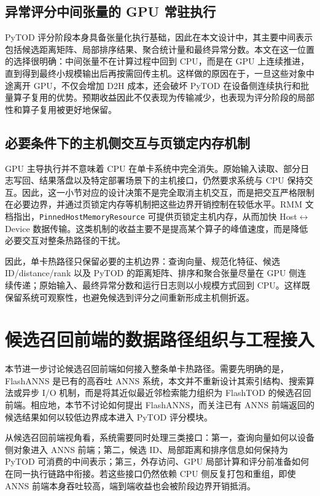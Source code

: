 \subsection{异常评分中间张量的 GPU 常驻执行}

PyTOD 评分阶段本身具备张量化执行基础，因此在本文设计中，其主要中间表示包括候选距离矩阵、局部排序结果、聚合统计量和最终异常分数。本文在这一位置的选择很明确：中间张量不在计算过程中回到 CPU，而是在 GPU 上连续推进，直到得到最终小规模输出后再按需回传主机。这样做的原因在于，一旦这些对象中途离开 GPU，不仅会增加 D2H 成本，还会破坏 PyTOD 在设备侧连续执行和批量算子复用的优势。预期收益因此不仅表现为传输减少，也表现为评分阶段的局部性和算子复用被更好地保留。

\subsection{必要条件下的主机侧交互与页锁定内存机制}

GPU 主导执行并不意味着 CPU 在单卡系统中完全消失。原始输入读取、部分日志写回、结果落盘以及特定部署场景下的主机接口，仍然要求系统与 CPU 保持交互。因此，这一小节对应的设计决策不是完全取消主机交互，而是把交互严格限制在必要边界，并通过页锁定内存等机制把这些边界开销控制在较低水平。RMM 文档指出，\texttt{PinnedHostMemoryResource} 可提供页锁定主机内存，从而加快 Host$\leftrightarrow$Device 数据传输\citep{rapids_rmm_pinned}。这类机制的收益主要不是提高某个算子的峰值速度，而是降低必要交互对整条热路径的干扰。

因此，单卡热路径只保留必要的主机边界：查询向量、规范化特征、候选 ID/distance/rank 以及 PyTOD 的距离矩阵、排序和聚合张量尽量在 GPU 侧连续传递；原始输入、最终异常分数和运行日志则以小规模方式回到 CPU。这样既保留系统可观察性，也避免候选到评分之间重新形成主机侧折返。

\section{候选召回前端的数据路径组织与工程接入}

本节进一步讨论候选召回前端如何接入整条单卡热路径。需要先明确的是，FlashANNS 是已有的高吞吐 ANNS 系统，本文并不重新设计其索引结构、搜索算法或异步 I/O 机制，而是将其近似最近邻检索能力组织为 FlashTOD 的候选召回前端。相应地，本节不讨论如何提出 FlashANNS，而关注已有 ANNS 前端返回的候选结果如何以较低边界成本进入 PyTOD 评分模块。

从候选召回前端视角看，系统需要同时处理三类接口：第一，查询向量如何以设备侧对象进入 ANNS 前端；第二，候选 ID、局部距离和排序信息如何保持为 PyTOD 可消费的中间表示；第三，外存访问、GPU 局部计算和评分前准备如何在同一执行链路中衔接。若这些接口仍然依赖 CPU 侧反复打包和重组，即使 ANNS 前端本身吞吐较高，端到端收益也会被阶段边界开销抵消。


